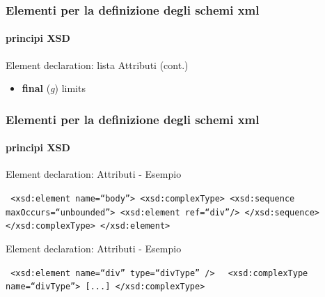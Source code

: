 \begin{frame}
	\frametitle{Elementi per la definizione degli schemi xml}
	\framesubtitle{principi XSD}
	\addtocounter{nframe}{1}

	\begin{block}{Element declaration: lista Attributi (cont.)}

		\begin{itemize}
			\item \textbf{final} (\textit{g}) limits
		\end{itemize}


	\end{block}

\end{frame}


\begin{frame}
	\frametitle{Elementi per la definizione degli schemi xml}
	\framesubtitle{principi XSD}
	\addtocounter{nframe}{1}

	\begin{block}{Element declaration: Attributi - Esempio }

		\texttt{
			<xsd:element name=``body''>
			<xsd:complexType>
			<xsd:sequence maxOccurs=``unbounded''>
			<xsd:element ref=``div''/>
			</xsd:sequence>
			</xsd:complexType>
			</xsd:element>
		}

	\end{block}


	\begin{block}{Element declaration: Attributi - Esempio }

		\texttt{
			<xsd:element name=``div'' type=``divType'' />
		}
		\texttt{
			<xsd:complexType name=``divType''>
			[...]
			</xsd:complexType>
		}

	\end{block}

\end{frame}







